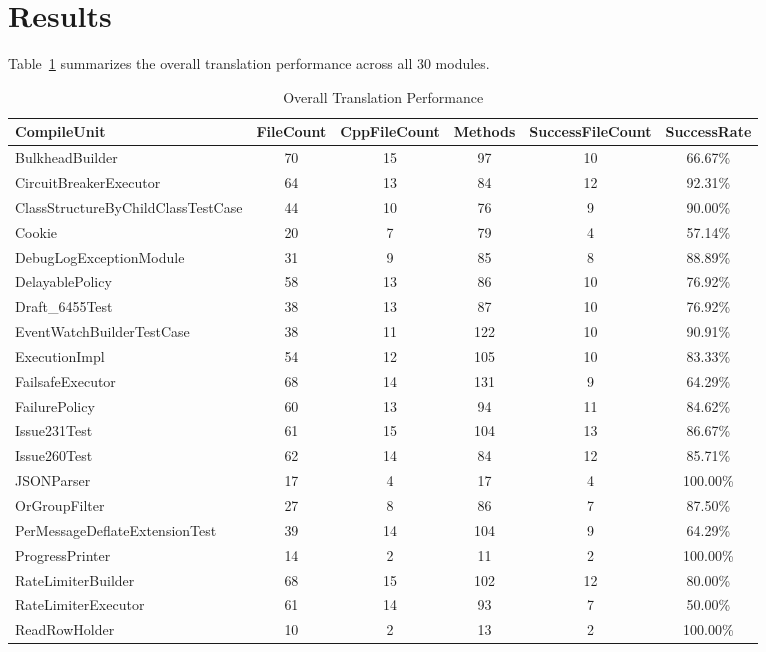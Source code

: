 
\section{Results}

Table~\ref{tab:overall-results} summarizes the overall translation performance across all 30 modules.

\begin{table}[h]
\centering
\caption{Overall Translation Performance}
\label{tab:overall-results}
\begin{tabular}{lccccc}
\toprule
\textbf{CompileUnit} & \textbf{FileCount} & \textbf{CppFileCount} & \textbf{Methods}& \textbf{SuccessFileCount} & \textbf{SuccessRate} \\
\midrule
BulkheadBuilder & 70 & 15 & 97 & 10 & 66.67\% \\
CircuitBreakerExecutor & 64 & 13 & 84 & 12 & 92.31\% \\
ClassStructureByChildClassTestCase & 44 & 10 & 76 & 9 & 90.00\% \\
Cookie & 20 & 7 & 79 & 4 & 57.14\% \\
DebugLogExceptionModule & 31 & 9 & 85 & 8 & 88.89\% \\
DelayablePolicy & 58 & 13 & 86 & 10 & 76.92\% \\
Draft\_6455Test & 38 & 13 & 87 & 10 & 76.92\% \\
EventWatchBuilderTestCase & 38 & 11 & 122 & 10 & 90.91\% \\
ExecutionImpl & 54 & 12 & 105 & 10 & 83.33\% \\
FailsafeExecutor & 68 & 14 & 131 & 9 & 64.29\% \\
FailurePolicy & 60 & 13 & 94 & 11 & 84.62\% \\
Issue231Test & 61 & 15 & 104 & 13 & 86.67\% \\
Issue260Test & 62 & 14 & 84 & 12 & 85.71\% \\
JSONParser & 17 & 4 & 17 & 4 & 100.00\% \\
OrGroupFilter & 27 & 8 & 86 & 7 & 87.50\% \\
PerMessageDeflateExtensionTest & 39 & 14 & 104 & 9 & 64.29\% \\
ProgressPrinter & 14 & 2 & 11 & 2 & 100.00\% \\
RateLimiterBuilder & 68 & 15 & 102 & 12 & 80.00\% \\
RateLimiterExecutor & 61 & 14 & 93 & 7 & 50.00\% \\
ReadRowHolder & 10 & 2 & 13 & 2 & 100.00\% \\

\end{tabular}
\end{table}
